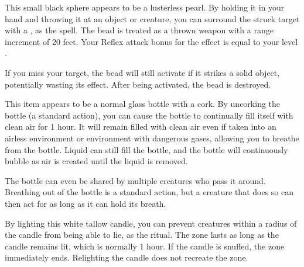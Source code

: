 
         This small black sphere appears to be a lusterless pearl.
        By holding it in your hand and throwing it at an object or creature, you can surround the struck target with a , as the spell.
        The bead is treated as a thrown weapon with a range increment of 20 feet.
        Your Reflex attack bonus for the  effect is equal to your level .

        If you miss your target, the bead will still activate if it strikes a solid object, potentially wasting its effect.
        After being activated, the bead is destroyed.


         This item appears to be a normal glass bottle with a cork.
        By uncorking the bottle (a standard action), you can cause the bottle to continually fill itself with clean air for 1 hour.
        It will remain filled with clean air even if taken into an airless environment or environment with dangerous gases, allowing you to breathe from the bottle.
        Liquid can still fill the bottle, and the bottle will continuously bubble as air is created until the liquid is removed.

        The bottle can even be shared by multiple creatures who pass it around.
        Breathing out of the bottle is a standard action, but a creature that does so can then act for as long as it can hold its breath.


         By lighting this white tallow candle, you can prevent creatures within a \areamed radius of the candle from being able to lie, as the  ritual.
        The zone lasts as long as the candle remains lit, which is normally 1 hour.
        If the candle is snuffed, the zone immediately ends.
        Relighting the candle does not recreate the zone.

